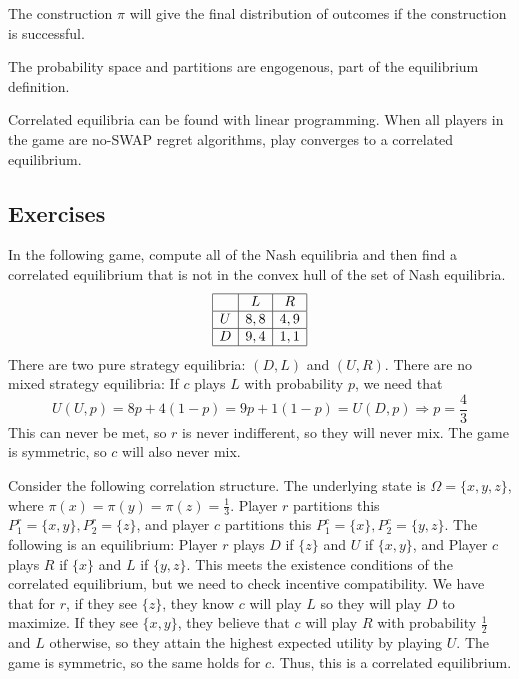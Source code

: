 \documentclass[10pt]{article}
\begin{document}
\begin{remark}
	The construction $\pi$ will give the final distribution of outcomes if the construction is successful.
\end{remark}
\begin{remark}
	The probability space and partitions are engogenous, part of the equilibrium definition.
\end{remark}
\begin{remark}
	Correlated equilibria can be found with linear programming. When all players in the game are no-SWAP regret algorithms, play converges to a correlated equilibrium.
\end{remark}

\subsection{Exercises}

In the following game, compute all of the Nash equilibria and then find a correlated equilibrium that is not in the convex hull of the set of Nash equilibria.
\[
\begin{array}{|c|c|c|}
	\hline & L & R \\\hline
	U & 8,8 & 4,9 \\\hline
	D & 9,4 & 1,1 \\\hline
\end{array}
\]
There are two pure strategy equilibria: $(D,L)$ and $(U,R)$. There are no mixed strategy equilibria: If $c$ plays $L$ with probability $p$, we need that \[U(U,p) = 8p + 4(1-p) = 9p + 1(1-p) = U(D,p) \Longrightarrow p = \frac{4}{3}\]This can never be met, so $r$ is never indifferent, so they will never mix. The game is symmetric, so $c$ will also never mix.

Consider the following correlation structure. The underlying state is $\Omega = \{x,y,z\}$, where $\pi(x) = \pi(y) = \pi(z) = \frac{1}{3}$. Player $r$ partitions this $P^r_1 = \{x,y\},P^r_2 = \{z\}$, and player $c$ partitions this $P^c_1 = \{x\},P^c_2 = \{y,z\}$. The following is an equilibrium: Player $r$ plays $D$ if $\{z\}$ and $U$ if $\{x,y\}$, and Player $c$ plays $R$ if $\{x\}$ and $L$ if $\{y,z\}$. This meets the existence conditions of the correlated equilibrium, but we need to check incentive compatibility. We have that for $r$, if they see $\{z\}$, they know $c$ will play $L$ so they will play $D$ to maximize. If they see $\{x,y\}$, they believe that $c$ will play $R$ with probability $\frac{1}{2}$ and $L$ otherwise, so they attain the highest expected utility by playing $U$. The game is symmetric, so the same holds for $c$. Thus, this is a correlated equilibrium.
\end{document}
